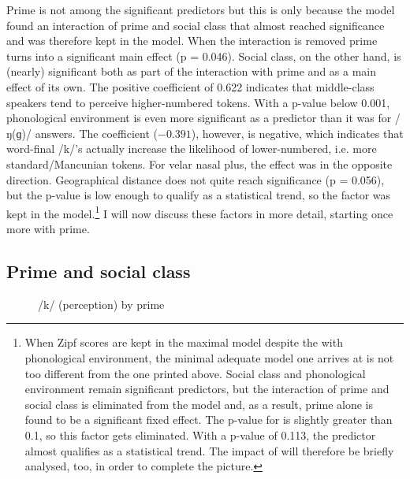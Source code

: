 Prime is not among the significant predictors but this is only because the model found an interaction of prime and social class that almost reached significance and was therefore kept in the model.
When the interaction is removed prime turns into a significant main effect (p = 0.046).
Social class, on the other hand, is (nearly) significant both as part of the interaction with prime and as a main effect of its own.
The positive coefficient of 0.622 indicates that middle-class speakers tend to perceive higher-numbered tokens.
With a p-value below 0.001, phonological environment is even more significant as a predictor than it was for /ŋ(ɡ)/ answers.
The coefficient (\ensuremath{-0.391}), however, is negative, which indicates that word-final /k/'s actually increase the likelihood of lower-numbered, i.e. more standard/Mancunian tokens.
For velar nasal plus, the effect was in the opposite direction.
Geographical distance does not quite reach significance (p = 0.056), but the p-value is low enough to qualify as a statistical trend, so the factor was kept in the model.\footnote{When Zipf scores are kept in the maximal model despite the  with phonological environment, the minimal adequate model one arrives at is not too different from the one printed above. Social class and phonological environment remain significant predictors, but the interaction of prime and social class is eliminated from the model and, as a result, prime alone is found to be a significant fixed effect. The p-value for  is slightly greater than 0.1, so this factor gets eliminated. With a p-value of 0.113, the predictor  almost qualifies as a statistical trend. The impact of  will therefore be briefly analysed, too, in order to complete the picture.}
I will now discuss these factors in more detail, starting once more with prime.

\subsection{Prime and social class}
\label{sec.perc_res.k.prime}

\begin{figure}
	
		\resizebox{.49\linewidth}{!}{} 
	\caption{/k/ (perception) by prime}
	\label{fig.bar.k.tot.ext}
\end{figure}

